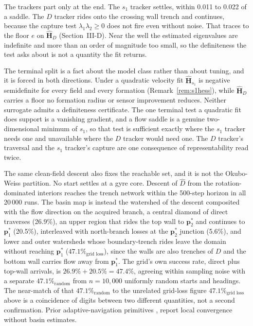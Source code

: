 \documentclass[lettersize,journal]{IEEEtran}
\begin{document}
The trackers part only at the end. The $s_1$ tracker settles, within
0.011 to 0.022 of a saddle. The $D$ tracker rides onto the crossing
wall trench and continues, because the capture test $\lambda_1\lambda_2
\geq 0$ does not fire even without noise. That traces to the floor $e$
on $\hat{\mathbf{H}}_D$ (Section~\mbox{III-D}). Near the well the
estimated eigenvalues are indefinite and more than an order of
magnitude too small, so the definiteness the test asks about is not a
quantity the fit returns.

The terminal split is a fact about the model class rather than about
tuning, and it is forced in both directions. Under a quadratic velocity
fit $\hat{\mathbf{H}}_{s_1}$ is negative semidefinite for every field
and every formation (Remark~\ref{rem:s1hess}), while
$\hat{\mathbf{H}}_D$ carries a floor no formation radius or sensor
improvement reduces. Neither surrogate admits a definiteness
certificate. The one terminal test a quadratic fit does support is a
vanishing gradient, and a flow saddle is a genuine two-dimensional
minimum of $s_1$, so that test is sufficient exactly where the $s_1$
tracker needs one and unavailable where the $D$ tracker would need one.
The $D$ tracker's traversal and the $s_1$ tracker's capture are one
consequence of representability read twice.

The same clean-field descent also fixes the reachable set, and it is
not the Okubo-Weiss partition. No start settles at a gyre core. Descent
of $\hat{D}$ from the rotation-dominated interiors reaches the trench
network within the 500-step horizon in all 20\,000 runs. The basin map
is instead the watershed of the descent composited with the flow
direction on the acquired branch, a central diamond of direct
traverses (26.9\%), an upper region that rides the top wall to
$\mathbf{p}^*_2$ and continues to $\mathbf{p}^*_1$ (20.5\%),
interleaved with north-branch losses at the $\mathbf{p}^*_2$ junction
(5.6\%), and lower and outer watersheds whose boundary-trench rides
leave the domain without reaching $\mathbf{p}^*_1$
($47.1\%_{\text{grid loss}}$), since the walls are also trenches of $D$
and the bottom wall carries flow away from $\mathbf{p}^*_1$. The grid's
own success rate, direct plus top-wall arrivals, is $26.9\% + 20.5\% =
47.4\%$, agreeing within sampling noise with a separate
$47.1\%_{\text{random}}$ from $n = 10{,}000$ uniformly random starts
and headings. The near-match of that $47.1\%_{\text{random}}$ to the
unrelated grid-loss figure $47.1\%_{\text{grid loss}}$ above is a
coincidence of digits between two different quantities, not a second
confirmation. Prior adaptive-navigation primitives \cite{3}, \cite{4}
report local convergence without basin estimates.
\end{document}
